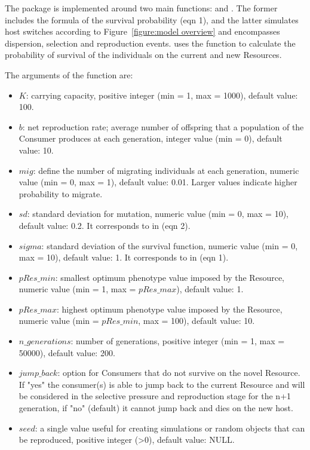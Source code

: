 The  package is implemented around two main functions:  and . The former includes the formula of the survival probability (eqn 1), and the latter simulates  host switches according to Figure~\ref{figure:model overview} and encompasses dispersion, selection and reproduction events.  uses the  function to calculate the probability of survival of the individuals on the current and new Resources.

The arguments of the  function are: 
\begin{itemize}
    \item $K$: carrying capacity, positive integer (min = 1, max = 1000), default value: 100.
    \item $b$: net reproduction rate; average number of offspring that a population of the Consumer produces at each generation, integer value (min = 0), default value: 10.
    \item $mig$: define the number of migrating individuals at each generation, numeric value (min = 0, max = 1), default value: 0.01. Larger values indicate higher probability to migrate.
    \item $sd$: standard deviation for mutation, numeric value (min = 0, max = 10), default value: 0.2. It corresponds to  in (eqn 2).
    \item $sigma$: standard deviation of the survival function, numeric value (min = 0, max = 10), default value: 1. It corresponds to  in (eqn 1).
    \item $pRes\_min$: smallest optimum phenotype value imposed by the Resource, numeric value (min = 1, max = $pRes\_max$), default value: 1.
    \item $pRes\_max$: highest optimum phenotype value imposed by the Resource, numeric value (min = $pRes\_min$, max = 100), default value: 10.
    \item $n\_generations$: number of generations, positive integer (min = 1, max = 50000), default value: 200.
    \item $jump\_back$: option for Consumers that do not survive on the novel Resource. If "yes" the consumer(s) is able to jump back to the current Resource and will be considered in the selective pressure and reproduction stage for the n+1 generation, if "no" (default) it cannot jump back and dies on the new host.
    \item $seed$: a single value useful for creating simulations or random objects that can be reproduced, positive integer (>0), default value: NULL.

\end{itemize}
